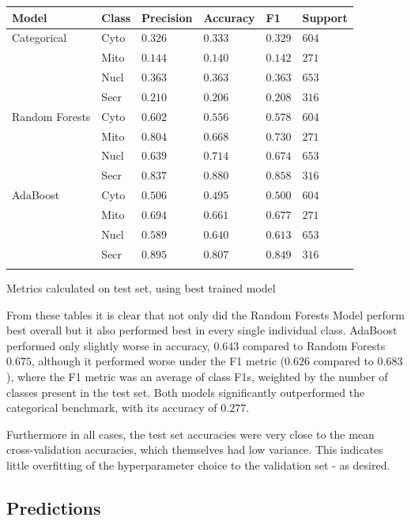 \documentclass{bioinfo}
\begin{document}
\begin{table}[!h]
 {\begin{tabular}{@{}llllll@{}}\toprule  Model & Class & Precision  & Accuracy & F1 & Support\\\midrule
Categorical  & Cyto & $0.326$ & $0.333$ & $0.329$ & $604$ \\
        & Mito & $0.144$ & $0.140$ & $0.142$ & $271$ \\
        & Nucl & $0.363$ & $0.363$ & $0.363$ & $653$ \\
        & Secr & $0.210$ & $0.206$ & $0.208$ & $316$ \\
\midrule
Random Forests & Cyto & $0.602$ & $0.556$ & $0.578$ & $604$ \\
        & Mito & $0.804$ & $0.668$ & $0.730$ & $271$ \\
        & Nucl & $0.639$ & $0.714$ & $0.674$ & $653$ \\
        & Secr & $0.837$ & $0.880$ & $0.858$ & $316$ \\
\midrule
AdaBoost & Cyto & $0.506$ & $0.495$ & $0.500$ & $604$ \\
        & Mito & $0.694$ & $0.661$ & $0.677$ & $271$ \\
        & Nucl & $0.589$ & $0.640$ & $0.613$ & $653$ \\
        & Secr & $0.895$ & $0.807$ & $0.849$ & $316$ \\\botrule

\end{tabular}}{Metrics calculated on test set, using best trained model}
\end{table}

From these tables it is clear that not only did the Random Forests Model perform best overall but it also performed best in every single individual class. AdaBoost performed only slightly worse in accuracy, $0.643$ compared to Random Forests $0.675$, although it performed worse under the F1 metric ($0.626$ compared to $0.683$), where the F1 metric was an average of class F1s, weighted by the number of classes present in the test set. Both models significantly outperformed the categorical benchmark, with its accuracy of $0.277$.

Furthermore in all cases, the test set accuracies were very close to the mean cross-validation accuracies, which themselves had low variance. This indicates little overfitting of the hyperparameter choice to the validation set - as desired.

\subsection{Predictions}
\end{document}
